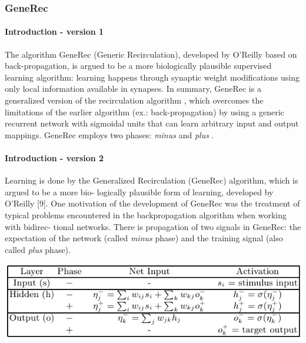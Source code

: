 \subsubsection{GeneRec}

\paragraph{Introduction - version 1} 
The algorithm GeneRec (Generic Recirculation), developed by O’Reilly \cite{o1996bio} based on back-propagation, is argued to be a more biologically plausible supervised learning algorithm: learning happens through synaptic weight modifications using only local information available in synapses. In summary, GeneRec is a generalized version of the recirculation algorithm \cite{hinton1988learning}, which overcomes the limitations of the earlier algorithm (ex.: back-propagation) by using a generic recurrent network with sigmoidal units that can learn arbitrary input and output mappings. GeneRec employs two phases: \emph{minus} and \emph{plus} \cite{da2011advances}. 

\paragraph{Introduction - version 2} 
Learning is done by the Generalized Recirculation
(GeneRec) algorithm, which is argued to be a more bio-
logically plausible form of learning, developed by O’Reilly
[9]. One motivation of the development of GeneRec was
the treatment of typical problems encountered in the
backpropagation algorithm when working with bidirec-
tional networks. There is propagation of two signals in
GeneRec: the expectation of the network (called \emph{minus}
phase) and the training signal (also called \emph{plus} phase).
\cite{schneider2009application} 

\begin{center} 
\includegraphics{img/table_generec.png} \cite{farkas2013bal}
\end{center} 

